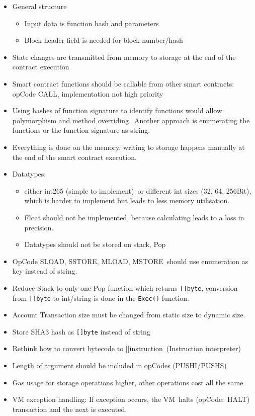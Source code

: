 \begin{itemize}
\item
  General structure

  \begin{itemize}
  \item
    Input data is function hash and parameters
  \item
    Block header field is needed for block number/hash
  \end{itemize}
\item
  State changes are transmitted from memory to storage at the end of the
  contract execution
\item
  Smart contract functions should be callable from other smart
  contracts: opCode CALL, implementation not high priority
\item
  Using hashes of function signature to identify functions would allow
  polymorphism and method overriding.~Another approach is enumerating
  the functions or the function signature as string.
\item
  Everything is done on the memory, writing to storage happens manually
  at the end of the smart contract execution.
\item
  Datatypes:

  \begin{itemize}
  \item
    either int265 (simple to implement)~or different int sizes (32, 64,
    256Bit), which is harder to implement but leads to less memory
    utilisation.
  \item
    Float should not be implemented, because calculating leads to a loss
    in precision.
  \item
    Datatypes should not be stored on stack, Pop
  \end{itemize}
\item
  OpCode SLOAD, SSTORE, MLOAD, MSTORE~should use enumeration as key
  instead of string.
\item
  Reduce Stack to only one Pop function which returns
  \texttt{{[}{]}byte}, conversion from \texttt{{[}{]}byte} to int/string
  is done in the \texttt{Exec()} function.
\item
  Account Transaction size must be changed from static size to dynamic
  size.
\item
  Store SHA3 hash as \texttt{{[}{]}byte} instead of string
\item
  Rethink how to convert bytecode to {[}{]}instruction~(Instruction
  interpreter)
\item
  Length of argument should be included in opCodes (PUSHI/PUSHS)
\item
  Gas usage for storage operations higher, other operations cost all the
  same
\item
  VM exception handling: If exception occurs, the VM~halts
  (opCode:~HALT) transaction and the next is executed.
\end{itemize}

